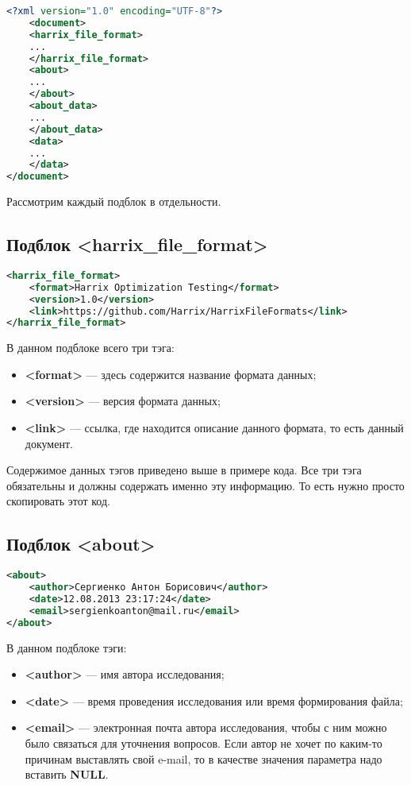 \documentclass[a4paper,12pt]{article}
\begin{document}
\begin{lstlisting}[label=Part03, language=xml ,caption=Подблоки в файле Harrix Optimization Testing]
<?xml version="1.0" encoding="UTF-8"?>
	<document>
	<harrix_file_format>
	...
	</harrix_file_format>
	<about>
	...
	</about>
	<about_data>
	...
	</about_data>
	<data>
	...
	</data>
</document>
\end{lstlisting}

Рассмотрим каждый подблок в отдельности.

\subsection{Подблок <harrix\_file\_format>}

\begin{lstlisting}[label=Part04, language=xml ,caption=Подблок в файле Harrix Optimization Testing]
<harrix_file_format>
	<format>Harrix Optimization Testing</format>
	<version>1.0</version>
	<link>https://github.com/Harrix/HarrixFileFormats</link>
</harrix_file_format>
\end{lstlisting}

В данном подблоке всего три тэга:
\begin{itemize}
\item \textbf{<format>} --- здесь содержится название формата данных;
\item \textbf{<version>} --- версия формата данных;
\item \textbf{<link>} --- ссылка, где находится описание данного формата, то есть данный документ.
\end{itemize}

Содержимое данных тэгов приведено выше в примере кода. Все три тэга обязательны и должны содержать именно эту информацию. То есть нужно просто скопировать этот код.

\subsection{Подблок <about>}

\begin{lstlisting}[label=Part04_2, language=xml ,caption=Подблок в файле Harrix Optimization Testing]
<about>
	<author>Сергиенко Антон Борисович</author>
	<date>12.08.2013 23:17:24</date>
	<email>sergienkoanton@mail.ru</email>
</about>
\end{lstlisting}

В данном подблоке тэги:
\begin{itemize}
\item \textbf{<author>} --- имя автора исследования;
\item \textbf{<date>} --- время проведения исследования или время формирования файла;
\item \textbf{<email>} --- электронная почта автора исследования, чтобы с ним можно было связаться для уточнения вопросов. Если автор не хочет по каким-то причинам выставлять свой e-mail, то в качестве значения параметра надо вставить \textbf{NULL}.
\end{itemize}
\end{document}

